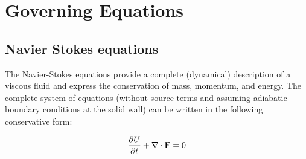 
\section{Governing Equations}
\label{sec:govEq}
\subsection{Navier Stokes equations}

The Navier-Stokes\cite{Landau1993} equations provide a complete (dynamical) description of a viscous fluid and express the conservation of mass, momentum, and energy. The complete system of equations (without source terms and assuming adiabatic boundary conditions at the solid wall) can be written in the following conservative form:

\begin{equation}\label{ns_simple}
\frac{\partial U}{\partial t} +  \nabla \cdot {\bf F} = 0
\end{equation}

